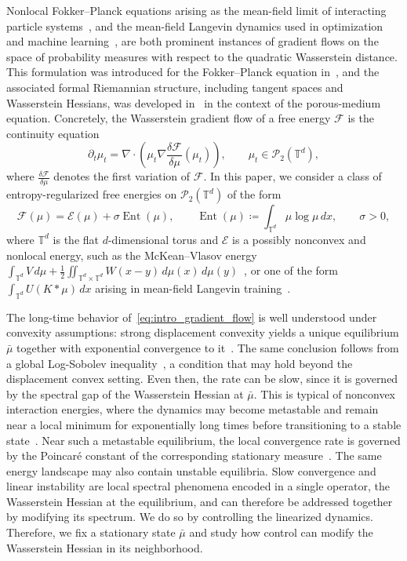 \documentclass[11pt]{article}
\numberwithin{equation}{section}
\theoremstyle{definition}
\newcommand{\T}{\mathbb{T}}
\newcommand{\Pcal}{\mathcal{P}}
\newcommand{\F}{\mathcal{F}}
\newcommand{\E}{\mathcal{E}}
\newcommand{\Ent}{\operatorname{Ent}}
\begin{document}
Nonlocal Fokker--Planck equations arising as the mean-field limit of interacting
particle systems~\cite{Sznitman1991}, and the mean-field Langevin dynamics used in optimization and machine learning~\cite{HuEtAl2021, Chizat2022}, are both prominent instances of gradient flows on the space of probability measures with respect to the quadratic Wasserstein distance. 
This formulation was introduced for the Fokker--Planck equation
in~\cite{JordanKinderlehrerOtto1998}, and the associated formal Riemannian structure, including tangent spaces and Wasserstein Hessians, was developed in~\cite{Otto2001} in the context of the porous-medium equation. 
Concretely, the Wasserstein gradient flow of a free energy $\F$ is the continuity equation
\begin{equation}
    \label{eq:intro_gradient_flow}
    \partial_t \mu_t = \nabla\cdot\left(\mu_t\nabla\frac{\delta\F}{\delta\mu}(\mu_t)\right), \qquad \mu_t \in \Pcal_2(\T^d),
\end{equation}
where $\frac{\delta\F}{\delta\mu}$ denotes the first variation of $\F$. 
In this paper, we consider a class of entropy-regularized free energies on $\Pcal_2(\T^d)$ of the form
\[
\F(\mu) = \E(\mu) + \sigma\Ent(\mu), \qquad \Ent(\mu) \coloneqq \int_{\T^d} \mu\log\mu\,dx, \qquad \sigma > 0,
\]
where $\T^d$ is the flat $d$-dimensional torus and $\E$ is a possibly nonconvex and nonlocal energy, such as the McKean--Vlasov energy $\int_{\T^d} V \, d\mu + \frac{1}{2} \iint_{\T^d\times\T^d} W(x-y) \, d\mu(x) \, d\mu(y)$~\cite{CarrilloMccannVillani2003}, or one of the form $\int_{\T^d} U(K*\mu) \, dx$ arising in mean-field Langevin training~\cite{Chizat2022}.

The long-time behavior of~\eqref{eq:intro_gradient_flow} is well understood under convexity assumptions: strong displacement convexity yields a unique equilibrium $\bar\mu$ together with exponential convergence to it~\cite{Santambrogio2017}.
The same conclusion follows from a global Log-Sobolev inequality~\cite{Chizat2022}, a condition that may hold beyond the displacement convex setting.
Even then, the rate can be slow, since it is governed by the spectral gap of the Wasserstein Hessian at $\bar\mu$.
This is typical of nonconvex interaction energies, where the dynamics may become metastable and remain near a local minimum for exponentially long times before transitioning to a stable state~\cite{BolleyGentilGuillin2012, CarrilloEtAl2020, Monmarche2025}.
Near such a metastable equilibrium, the local convergence rate is governed by the Poincar\'e constant of the corresponding stationary measure~\cite{WangChizat2026, MonmarcheReygner2025}.
The same energy landscape may also contain unstable equilibria.
Slow convergence and linear instability are local spectral phenomena encoded in a single operator, the Wasserstein Hessian at the equilibrium, and can therefore be addressed together by modifying its spectrum.
We do so by controlling the linearized dynamics.
Therefore, we fix a stationary state $\bar\mu$ and study how control can modify the Wasserstein Hessian in its neighborhood.
\end{document}
